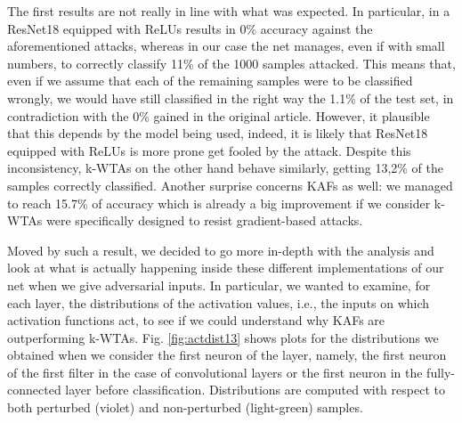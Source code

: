 \documentclass[LaM,binding=0.6cm]{./packages/sapthesis/sapthesis}
\begin{document}
        The first results are not really in line with what was expected. In particular, in \cite{kwta} a ResNet18 equipped with ReLUs results in 0\% accuracy 
        against the aforementioned attacks, whereas in our case the net manages, even if with small numbers, to correctly classify 11\% of the 1000 samples 
        attacked. This means that, even if we assume that each of the remaining samples were to be classified wrongly, we would have still classified in the 
        right way the 1.1\% of the test set, in contradiction with the 0\% gained in the original article. However, it plausible that this depends by the model 
        being used, indeed, it is likely that ResNet18 equipped with ReLUs is more prone get fooled by the attack. Despite this inconsistency, k-WTAs on the other 
        hand behave similarly, getting 13,2\% of the samples correctly classified. Another surprise concerns KAFs as well: we managed to reach 15.7\% of accuracy 
        which is already a big improvement if we consider k-WTAs were specifically designed to resist gradient-based attacks.
        
        Moved by such a result, we decided to go more in-depth with the analysis and look at what is actually happening inside these different implementations of our 
        net when we give adversarial inputs. In particular, we wanted to examine, for each layer, the distributions of the activation values, i.e., the inputs on which activation
        functions act, to see if we could understand why KAFs are outperforming k-WTAs. Fig. \ref{fig:actdist13} shows plots for the distributions we obtained when we 
        consider the first neuron of the layer, namely, the first neuron of the first filter in the case of convolutional layers or the first neuron in the 
        fully-connected layer before classification. Distributions are computed with respect to both perturbed (violet) and non-perturbed (light-green) samples. 
\end{document}

